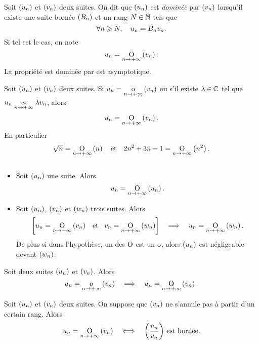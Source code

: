 \documentclass{magnoliaold}
\begin{document}
\begin{definition}[utile=-3]
Soit $\left(u_n\right)$ et $\left(v_n\right)$ deux suites. On dit que $\left(u_n\right)$ est \emph{dominée} par
$\left(v_n\right)$ lorsqu'il existe une suite bornée $\left(B_n\right)$ et un rang $N\in\mathbb{N}$ tels que
\[\forall n\geqslant N ,\quad u_n=B_n v_n.\]
Si tel est le cas, on note
\[u_n=\underset{n \rightarrow +\infty}{\text{O}}\left(v_n\right).\]
La propriété \og est dominée par \fg est asymptotique.
\end{definition}

\begin{remarqueUnique}
\remarque Soit $\left(u_n\right)$ et $\left(v_n\right)$ deux suites. Si $u_n=\underset{n \rightarrow +\infty}{\text{o}}\left(v_n\right)$ ou
 s'il existe $\lambda\in\mathbb{C}$ tel que $u_n\underset{n\rightarrow +\infty}{\sim}\lambda v_n$, alors
 \[u_n=\underset{n \rightarrow +\infty}{\text{O}}\left(v_n\right).\]
 En particulier
  \[\sqrt{n} =\underset{n \rightarrow +\infty}{\text{O}}\left(n\right) \quad\text{et}\quad
    2 n^2+3n-1 = \underset{n \rightarrow +\infty}{\text{O}}\left(n^2\right).\]
\end{remarqueUnique}

\begin{proposition}[utile=-3]
$\quad$
\begin{itemize}
\item Soit $\left(u_n\right)$ une suite. Alors
  \[u_n=\underset{n \rightarrow +\infty}{\text{O}}\left(u_n\right).\]
\item Soit $\left(u_n\right)$, $\left(v_n\right)$ et $\left(w_n\right)$ trois suites. Alors
  \[\left[u_n=\underset{n \rightarrow +\infty}{\text{O}}\left(v_n\right) \quad\!\text{et}\quad\! v_n=\underset{n \rightarrow +\infty}{\text{O}}\left(w_n\right)\right]
    \quad\Longrightarrow\quad u_n=\underset{n \rightarrow +\infty}{\text{O}}\left(w_n\right).\]
  De plus si dans l'hypothèse, un des ${\rm O}$ est un ${\rm o}$, alors $\left(u_n\right)$ est
  négligeable devant $\left(w_n\right)$.
\end{itemize}
\end{proposition}

\begin{proposition}[utile=-3]
Soit deux suites $\left(u_n\right)$ et $\left(v_n\right)$. Alors
\[u_n=\underset{n \rightarrow +\infty}{\text{o}}\left(v_n\right) \quad\Longrightarrow\quad
  u_n=\underset{n \rightarrow +\infty}{\text{O}}\left(v_n\right).\]
\end{proposition}

\begin{proposition}[utile=-3]
Soit $\left(u_n\right)$ et $\left(v_n\right)$ deux suites. On suppose que $\left(v_n\right)$ ne s'annule pas à
partir d'un certain rang. Alors
\[u_n=\underset{n \rightarrow +\infty}{\text{O}}\left(v_n\right) \quad\Longleftrightarrow\quad
  \text{$\left(\frac{u_n}{v_n}\right)$ est bornée}.\]
\end{proposition}
\end{document}
